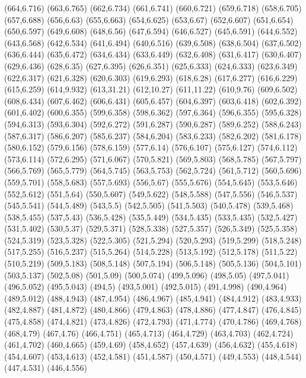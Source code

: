 (664,6.716)
(663,6.765)
(662,6.734)
(661,6.741)
(660,6.721)
(659,6.718)
(658,6.705)
(657,6.688)
(656,6.63)
(655,6.663)
(654,6.625)
(653,6.67)
(652,6.607)
(651,6.654)
(650,6.597)
(649,6.608)
(648,6.56)
(647,6.594)
(646,6.527)
(645,6.591)
(644,6.552)
(643,6.568)
(642,6.534)
(641,6.494)
(640,6.516)
(639,6.508)
(638,6.504)
(637,6.502)
(636,6.444)
(635,6.472)
(634,6.434)
(633,6.449)
(632,6.408)
(631,6.417)
(630,6.407)
(629,6.436)
(628,6.35)
(627,6.395)
(626,6.351)
(625,6.333)
(624,6.333)
(623,6.349)
(622,6.317)
(621,6.328)
(620,6.303)
(619,6.293)
(618,6.28)
(617,6.277)
(616,6.229)
(615,6.259)
(614,9.932)
(613,31.21)
(612,10.27)
(611,11.22)
(610,9.76)
(609,6.502)
(608,6.434)
(607,6.462)
(606,6.431)
(605,6.457)
(604,6.397)
(603,6.418)
(602,6.392)
(601,6.402)
(600,6.355)
(599,6.358)
(598,6.362)
(597,6.364)
(596,6.355)
(595,6.328)
(594,6.313)
(593,6.304)
(592,6.272)
(591,6.287)
(590,6.287)
(589,6.252)
(588,6.243)
(587,6.317)
(586,6.207)
(585,6.237)
(584,6.204)
(583,6.233)
(582,6.202)
(581,6.178)
(580,6.152)
(579,6.156)
(578,6.159)
(577,6.14)
(576,6.107)
(575,6.127)
(574,6.112)
(573,6.114)
(572,6.295)
(571,6.067)
(570,5.821)
(569,5.803)
(568,5.785)
(567,5.797)
(566,5.769)
(565,5.779)
(564,5.745)
(563,5.753)
(562,5.724)
(561,5.712)
(560,5.696)
(559,5.701)
(558,5.683)
(557,5.693)
(556,5.67)
(555,5.676)
(554,5.645)
(553,5.646)
(552,5.612)
(551,5.64)
(550,5.607)
(549,5.622)
(548,5.588)
(547,5.556)
(546,5.537)
(545,5.541)
(544,5.489)
(543,5.5)
(542,5.505)
(541,5.503)
(540,5.478)
(539,5.468)
(538,5.455)
(537,5.43)
(536,5.428)
(535,5.449)
(534,5.435)
(533,5.435)
(532,5.427)
(531,5.402)
(530,5.37)
(529,5.371)
(528,5.338)
(527,5.357)
(526,5.349)
(525,5.358)
(524,5.319)
(523,5.328)
(522,5.305)
(521,5.294)
(520,5.293)
(519,5.299)
(518,5.248)
(517,5.255)
(516,5.237)
(515,5.264)
(514,5.228)
(513,5.192)
(512,5.178)
(511,5.22)
(510,5.219)
(509,5.183)
(508,5.148)
(507,5.194)
(506,5.148)
(505,5.136)
(504,5.101)
(503,5.137)
(502,5.08)
(501,5.09)
(500,5.074)
(499,5.096)
(498,5.05)
(497,5.041)
(496,5.052)
(495,5.043)
(494,5)
(493,5.001)
(492,5.015)
(491,4.998)
(490,4.964)
(489,5.012)
(488,4.943)
(487,4.954)
(486,4.967)
(485,4.941)
(484,4.912)
(483,4.933)
(482,4.887)
(481,4.872)
(480,4.866)
(479,4.863)
(478,4.886)
(477,4.847)
(476,4.845)
(475,4.858)
(474,4.821)
(473,4.826)
(472,4.793)
(471,4.774)
(470,4.786)
(469,4.768)
(468,4.79)
(467,4.76)
(466,4.751)
(465,4.713)
(464,4.729)
(463,4.703)
(462,4.724)
(461,4.702)
(460,4.665)
(459,4.69)
(458,4.652)
(457,4.639)
(456,4.632)
(455,4.618)
(454,4.607)
(453,4.613)
(452,4.581)
(451,4.587)
(450,4.571)
(449,4.553)
(448,4.544)
(447,4.531)
(446,4.556)
